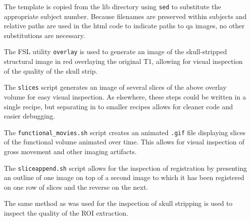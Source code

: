 The template is copied from the lib directory using \texttt{sed} to substitute the appropriate subject number. Because filenames are preserved within subjects and relative paths are used in the html code to indicate paths to qa images, no other substitutions are necessary.

The FSL utility \texttt{overlay} is used to generate an image of the skull-stripped structural image in red overlaying the original T1, allowing for visual inspection of the quality of the skull strip.

The \texttt{slices} script generates an image of several slices of the above overlay volume for easy visual inspection. As elsewhere, these steps could be written in a single recipe, but separating in to smaller recipes allows for cleaner code and easier debugging.

The \texttt{functional_movies.sh} script creates an animated \texttt{.gif} file displaying slices of the functional volume animated over time. This allows for visual inspection of gross movement and other imaging artifacts.

The \texttt{sliceappend.sh} script allows for the inspection of registration by presenting an outline of one image on top of a second image to which it has been registered on one row of slices and the reverse on the next.

The same method as was used for the inspection of skull stripping is used to inspect the quality of the ROI extraction.
